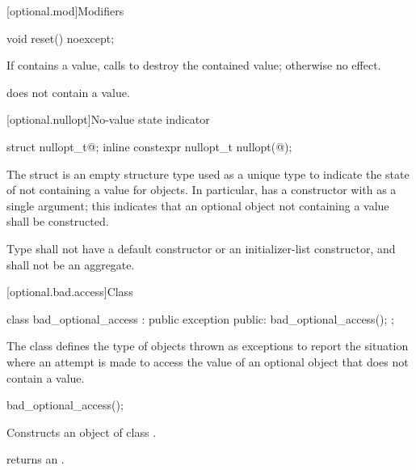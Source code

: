 [optional.mod]{Modifiers}

%
\begin{itemdecl}
void reset() noexcept;
\end{itemdecl}

\begin{itemdescr}
\pnum
\effects
If  contains a value, calls  to destroy the contained value;
otherwise no effect.

\pnum
\postconditions
{} does not contain a value.
\end{itemdescr}

[optional.nullopt]{No-value state indicator}

%
%
\begin{itemdecl}
struct nullopt_t{@\seebelow@};
inline constexpr nullopt_t nullopt(@\unspec@);
\end{itemdecl}

\pnum
The struct  is an empty structure type used as a unique type to indicate the state of not containing a value for  objects.
In particular,  has a constructor with  as a single argument;
this indicates that an optional object not containing a value shall be constructed.

\pnum
Type  shall not have a default constructor or an initializer-list constructor, and shall not be an aggregate.

[optional.bad.access]{Class }

\begin{codeblock}
class bad_optional_access : public exception {
public:
  bad_optional_access();
};
\end{codeblock}

\pnum
The class  defines the type of objects thrown as exceptions to report the situation where an attempt is made to access the value of an optional object that does not contain a value.

%
%
\begin{itemdecl}
bad_optional_access();
\end{itemdecl}

\begin{itemdescr}
\pnum
\effects
Constructs an object of class .

\pnum
\postconditions
{} returns an
\ntbs{}.
\end{itemdescr}

